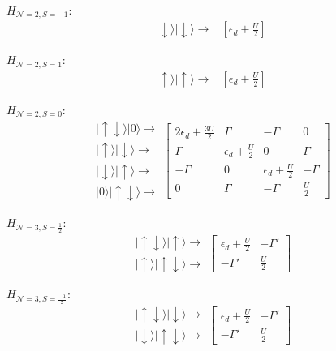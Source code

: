 \begin{multicols}{2}

$H_{\mathcal{N}=2,S=-1}:$
\[
\begin{array}{c}
\vert\downarrow\rangle\vert\downarrow\rangle\rightarrow\end{array}\begin{array}{c}
\left[\epsilon_{d}+\frac{U}{2}\right]\end{array}
\]


$H_{\mathcal{N}=2,S=1}:$
\[
\begin{array}{c}
\vert\uparrow\rangle\vert\uparrow\rangle\rightarrow\end{array}\begin{array}{c}
\left[\epsilon_{d}+\frac{U}{2}\right]\end{array}
\]


\end{multicols}


$H_{\mathcal{N}=2,S=0}:$
\[
\begin{array}{c}
\vert\uparrow\!\downarrow\rangle\vert0\rangle\rightarrow\\
\vert\uparrow\rangle\vert\downarrow\rangle\rightarrow\\
\vert\downarrow\rangle\vert\uparrow\rangle\rightarrow\\
\vert0\rangle\vert\uparrow\!\downarrow\rangle\rightarrow
\end{array}\left[\begin{array}{cccc}
2\epsilon_{d}+\frac{3U}{2} & \Gamma & -\Gamma & 0\\
\Gamma & \epsilon_{d}+\frac{U}{2} & 0 & \Gamma\\
-\Gamma & 0 & \epsilon_{d}+\frac{U}{2} & -\Gamma\\
0 & \Gamma & -\Gamma & \frac{U}{2}
\end{array}\right]
\]


\begin{multicols}{2}

$H_{\mathcal{N}=3,S=\frac{1}{2}}:$
\[
\begin{array}{c}
\vert\uparrow\!\downarrow\rangle\vert\uparrow\rangle\rightarrow\\
\vert\uparrow\rangle\vert\uparrow\!\downarrow\rangle\rightarrow
\end{array}\left[\begin{array}{cc}
\epsilon_{d}+\frac{U}{2} & -\Gamma'\\
-\Gamma' & \frac{U}{2}
\end{array}\right]
\]


$H_{\mathcal{N}=3,S=\frac{-1}{2}}:$
\[
\begin{array}{c}
\vert\uparrow\!\downarrow\rangle\vert\downarrow\rangle\rightarrow\\
\vert\downarrow\rangle\vert\uparrow\!\downarrow\rangle\rightarrow
\end{array}\left[\begin{array}{cc}
\epsilon_{d}+\frac{U}{2} & -\Gamma'\\
-\Gamma' & \frac{U}{2}
\end{array}\right]
\]


\end{multicols}

